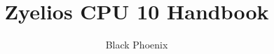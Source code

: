 \documentclass[a4paper,twoside,12pt]{book}
\begin{document}
\pagestyle{empty} %



\title{Zyelios CPU 10 Handbook}
\author{Black Phoenix}
\maketitle


\setcounter{tocdepth}{1}
\tableofcontents %
\cleardoublepage %

\pagestyle{plain} %













%
\end{document}
